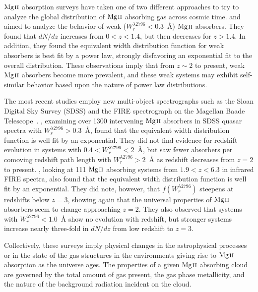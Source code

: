 \documentclass[iop,apj,numberedappendix,appendixfloats,twocolappendix]{emulateapj}
\begin{document}
${\hbox{{\rm Mg}\kern 0.1em{\sc ii}}}$ absorption surveys have taken one of two different approaches to try to analyze the global distribution of ${\hbox{{\rm Mg}\kern 0.1em{\sc ii}}}$ absorbing gas across cosmic time. \cite{Churchill1999} and \cite{Narayanan2007} aimed to analyze the behavior of weak ($W_r^{\lambda2796} < 0.3$~{\AA}) ${\hbox{{\rm Mg}\kern 0.1em{\sc ii}}}$ absorbers. They found that $dN\!/dz$ increases from $0 < z < 1.4$, but then decreases for $z > 1.4$. In addition, they found the equivalent width distribution function for weak absorbers is best fit by a power law, strongly disfavoring an exponential fit to the overall distribution. These observations imply that from $z \sim 2$ to present, weak ${\hbox{{\rm Mg}\kern 0.1em{\sc ii}}}$ absorbers become more prevalent, and these weak systems may exhibit self-similar behavior based upon the nature of power law distributions. 

The most recent studies employ new multi-object spectrographs such as the Sloan Digital Sky Survey (SDSS) and the FIRE spectrograph on the Magellan Baade Telescope~\citep{Nestor2005,Matejek2012}. \cite{Nestor2005}, examining over 1300 intervening ${\hbox{{\rm Mg}\kern 0.1em{\sc ii}}}$ absorbers in SDSS quasar spectra with $W_r^{\lambda2796} > 0.3$~{\AA}, found that the equivalent width distribution function is well fit by an exponential. They did not find evidence for redshift evolution in systems with $0.4 < W_r^{\lambda2796} < 2$~{\AA}, but saw fewer absorbers per comoving redshift path length with $W_r^{\lambda2796} > 2$~{\AA} as redshift decreases from $z = 2$ to present. \cite{Matejek2012}, looking at 111 ${\hbox{{\rm Mg}\kern 0.1em{\sc ii}}}$ absorbing systems from $1.9 < z < 6.3$ in infrared FIRE spectra, also found that the equivalent width distribution function is well fit by an exponential. They did note, however, that $f(W_r^{\lambda2796})$ steepens at redshifts below $z = 3$, showing again that the universal properties of ${\hbox{{\rm Mg}\kern 0.1em{\sc ii}}}$ absorbers seem to change approaching $z = 2$. They also observed that systems with $W_r^{\lambda2796} < 1.0$~{\AA} show no evolution with redshift, but stronger systems increase nearly three-fold in $dN\!/dz$ from low redshift to $z = 3$. 

Collectively, these surveys imply physical changes in the astrophysical processes or in the state of the gas structures in the environments giving rise to ${\hbox{{\rm Mg}\kern 0.1em{\sc ii}}}$ absorption as the universe ages. The properties of a given ${\hbox{{\rm Mg}\kern 0.1em{\sc ii}}}$ absorbing cloud are governed by the total amount of gas present, the gas phase metallicity, and the nature of the background radiation incident on the cloud.
\end{document}
